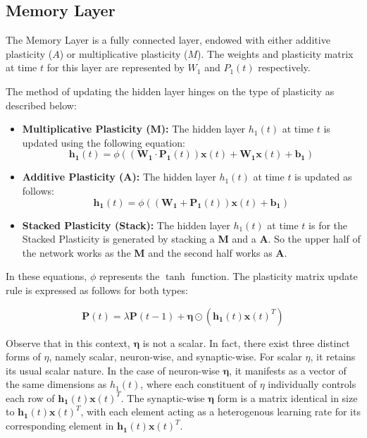 \documentclass{article}
\begin{document}
\subsection{Memory Layer}
The Memory Layer is a fully connected layer, endowed with either additive plasticity ($A$) or multiplicative plasticity ($M$). The weights and plasticity matrix at time $t$ for this layer are represented by $W_1$ and $P_1(t)$ respectively.

The method of updating the hidden layer hinges on the type of plasticity as described below:

\begin{itemize}
    \item \textbf{Multiplicative Plasticity (\textbf{M}):} The hidden layer $h_1(t)$ at time $t$ is updated using the following equation:
    \begin{equation}
    \boldsymbol{h_1}(t)=\phi\left(\left(\boldsymbol{W_1} \cdot \boldsymbol{P_1}(t)\right) \boldsymbol{x}(t)+\boldsymbol{W_1} \boldsymbol{x}(t)+\boldsymbol{b_1}\right)
    \end{equation}
    
    \item \textbf{Additive Plasticity (\textbf{A}):} The hidden layer $h_1(t)$ at time $t$ is updated as follows:
    \begin{equation}
    \boldsymbol{h_1}(t)=\phi\left(\left(\boldsymbol{W_1}+\boldsymbol{P_1}(t)\right) \boldsymbol{x}(t)+\boldsymbol{b_1}\right)
    \end{equation}
    
     \item \textbf{Stacked Plasticity (\textbf{Stack}):} The hidden layer $h_1(t)$ at time $t$ is for the Stacked Plasticity is generated by stacking a \textbf{M} and a \textbf{A}. So the upper half of the network works as the \textbf{M} and the second half works as \textbf{A}.
\end{itemize}

In these equations, $\phi$ represents the $\tanh$ function. The plasticity matrix update rule is expressed as follows for both types:

\begin{equation}
\boldsymbol{P}(t)=\lambda \boldsymbol{P}(t-1)+ \boldsymbol{\eta} \odot\left(\boldsymbol{h_1}(t) \boldsymbol{x}(t)^T\right)
\end{equation}

Observe that in this context, $\boldsymbol{\eta}$ is not a scalar. In fact, there exist three distinct forms of $\eta$, namely scalar, neuron-wise, and synaptic-wise. For scalar $\eta$, it retains its usual scalar nature. In the case of neuron-wise $\boldsymbol{\eta}$, it manifests as a vector of the same dimensions as $h_1(t)$, where each constituent of $\eta$ individually controls each row of $\boldsymbol{h_1}(t) \boldsymbol{x}(t)^T$. The synaptic-wise $\boldsymbol{\eta}$ form is a matrix identical in size to $\boldsymbol{h_1}(t) \boldsymbol{x}(t)^T$, with each element acting as a heterogenous learning rate for its corresponding element in $\boldsymbol{h_1}(t) \boldsymbol{x}(t)^T$.
\end{document}
